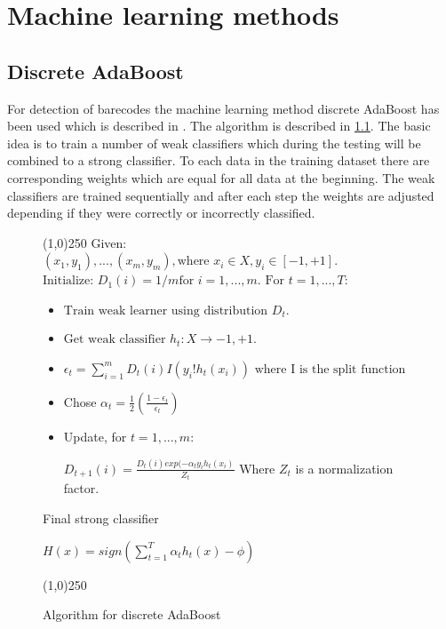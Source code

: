 \chapter{Machine learning methods}
\label{sec:Machine learning methods}

\section{Discrete AdaBoost}
\label{sec:Discret AdaBoost}
For detection of barecodes the machine learning method discrete AdaBoost has been used which is described in \citep{Friedman:2000}. The algorithm is described in \ref{AdaBoost}. The basic idea is to train a number of weak classifiers which during the testing will be combined to a strong classifier. To each data in the training dataset there are corresponding weights which are equal for all data at the beginning. The weak classifiers are trained sequentially and after each step the weights are adjusted depending if they were correctly or incorrectly classified.

\begin{figure} [H]
\line(1,0){250} \newline
Given: $(x_1,y_1),...,(x_m,y_m), \text{where } x_i\in X, y_i \in [-1,+1]$. \newline
$\text{Initialize: } D_1(i)=1/m \text{for } i=1,...,m.$ \newline \newline
$\text{For } t=1,...,T:$
\begin{itemize}
\item $\text{Train weak learner using distribution } D_t.$
\item $\text{Get weak classifier } h_t : X \to {-1,+1}$.
\item {}
\begin{center} 

	$\epsilon_t = \sum_{i=1}^{m} D_t(i)I(y_i ! h_t(x_i))$ \newline
	$\text{where I is the split function}$ \newline
\end{center}
\item Chose $ \alpha_t = \frac{1}{2}(\frac{1-\epsilon_t}{\epsilon_t})$
\item Update, for $t = 1,...,m:$
\begin{center} 

	$D_{t+1}(i) = \frac{D_t(i)exp(-\alpha_ty_ih_t(x_i)}{Z_t}$ \newline
	Where $Z_t$ is a normalization factor. \newline
\end{center}
\end{itemize}
Final strong classifier
\begin{center}
	$ H(x) = sign(\sum_{t=1}^{T} {\alpha_th_t(x)}-\phi)$
\end{center}
\line(1,0){250}
\caption{Algorithm for discrete AdaBoost}
\label{AdaBoost}
\end{figure}


